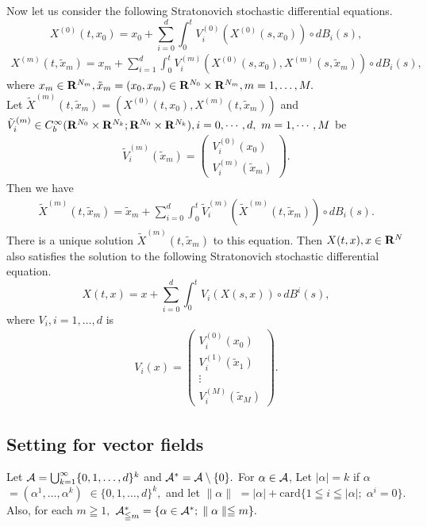 \documentclass[12pt]{article}
\begin{document}
\noindent Now let us consider the following Stratonovich stochastic differential equations.
\begin{equation}
{X}^{(0)}(t,x_0) = {x}_0 + \sum_{i=0}^{d} \int_{0}^{t} V^{(0)}_{ i}({X}^{(0)}(s,{x}_0))\circ dB_i(s),
\label{eq:SDE0}
\end{equation}
\begin{align}
{X}^{(m)}(t,\tilde{x}_m) = {x}_m +  \sum_{i=1}^{d} \int_{0}^{t} V^{(m)}_{i}({X}^{(0)}(s,{x}_0), {X}^{(m)}(s,\tilde{x}_m))\circ dB_i(s),
\label{eq:SDEk}
\end{align}
where $x_m \in {\bf R}^{N_m}, \tilde{x}_m=(x_0, x_m) \in {\bf R}^{{N}_0}\times {\bf R}^{{N}_m}, m=1,\ldots,M.$\\
 Let $\tilde{X}^{(m)}(t,\tilde{x}_m) = ({X}^{(0)}(t,{x}_0), {X}^{(m)}(t,\tilde{x}_m))$ and $\tilde{V}^{(m)}_ i \in C^{\infty}_b({\bf R}^{{N}_0}\times {\bf R}^{{N}_k};{\bf R}^{{N}_0}\times{\bf R}^{{N}_k}), i =0, \cdots, d, \ m = 1,\cdots, M$ be \begin{align*}
 \tilde{V}^{(m)}_{i}(\tilde{x}_m)= 
 \begin{pmatrix}
 V^{(0)}_{ i}(x_0)\\
 V^{(m)}_{ i}(\tilde{x}_m)
 \end{pmatrix} .
 \end{align*}
Then we have
\begin{align}
\tilde{X}^{(m)}(t,\tilde{x}_m) = \tilde{x}_m + \sum_{i=0}^{d} \int_{0}^{t} \tilde{V}^{(m)}_i(\tilde{X}^{(m)}(t,\tilde{x}_m) )\circ d B_i(s).
\end{align}
There is a unique solution $\tilde{X}^{(m)}(t,\tilde{x}_m) $ 
to this equation. 
Then $X(t,x), x\in {\bf R}^N$ also satisfies the solution to the following Stratonovich stochastic differential equation. 
\begin{equation}
X(t,x) = x + \sum_{i=0}^{d} \int_{0}^{t} {V}_i(X(s,x))\circ d {B}^i(s),
\label{eq:SDE}
\end{equation}
where ${V}_i, i =1,\ldots, d$ is
\begin{align*}
 {V}_{i}(x)= 
 \begin{pmatrix}
 V^{(0)}_{ i}(x_0)\\
  V^{(1)}_{ i}(\tilde{x}_1)\\
 \vdots \\
 V^{(M)}_{ i}(\tilde{x}_M)
 \end{pmatrix} .
 \end{align*}

\subsection{Setting for vector fields}
Let ${\cal A}=\bigcup_{k = 1}^{\infty} \{ 0,1,\ldots , d \}^k$
and ${\cal A}^{*}= {\cal A} \setminus \{ 0\} .$ 
For $\alpha \in {\cal A}$, 
Let $|\alpha | = k$ if 
$\alpha $ $= (\alpha^1,\ldots ,\alpha^k)$
$\in \{ 0,1,\ldots , d \}^k ,$ and 
let $ \parallel \alpha \parallel $ 
$ = |\alpha | + \mbox{card}\{ 1 \leqq i \leqq |\alpha | ; 
\; \alpha^i = 0 \}.$ 
Also, for each $m\geqq 1,$ ${\cal A}^{*}_{\leqq m}  
=\{ \alpha \in {\cal A}^{*}; \; \parallel \alpha \parallel \leqq m \} .$
\end{document}
